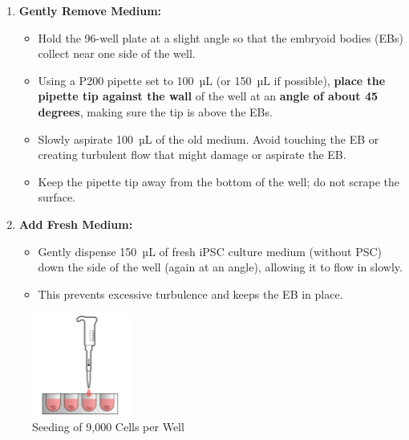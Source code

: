 \documentclass[11pt]{article}
\begin{document}
\begin{enumerate}[leftmargin=*]
    \item \textbf{Gently Remove Medium:}
    \begin{itemize}
        \item Hold the 96-well plate at a slight angle so that the embryoid bodies (EBs) collect near one side of the well.
        \item Using a P200 pipette set to 100~µL (or 150~µL if possible), \textbf{place the pipette tip against the wall} of the well at an \textbf{angle of about 45 degrees}, making sure the tip is above the EBs.
        \item Slowly aspirate 100~µL of the old medium. Avoid touching the EB or creating turbulent flow that might damage or aspirate the EB. 
        \item Keep the pipette tip away from the bottom of the well; do not scrape the surface.
    \end{itemize}

    \item \textbf{Add Fresh Medium:}
    \begin{itemize}
        \item Gently dispense 150~µL of fresh iPSC culture medium (without PSC) down the side of the well (again at an angle), allowing it to flow in slowly.
        \item This prevents excessive turbulence and keeps the EB in place.
    \end{itemize}

\end{enumerate}

\begin{figure}[H]
    \centering
    \includegraphics[width=0.3\textwidth]{1.png}
    \caption{Seeding of 9,000 Cells per Well}
    \label{fig:seeding}
\end{figure}

\end{document}

